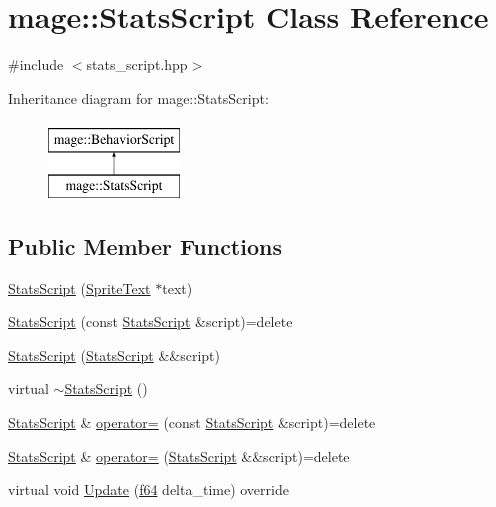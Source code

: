 \hypertarget{classmage_1_1_stats_script}{}\section{mage\+:\+:Stats\+Script Class Reference}
\label{classmage_1_1_stats_script}


{\ttfamily \#include $<$stats\+\_\+script.\+hpp$>$}

Inheritance diagram for mage\+:\+:Stats\+Script\+:\begin{figure}[H]
\begin{center}
\leavevmode
\includegraphics[height=2.000000cm]{classmage_1_1_stats_script}
\end{center}
\end{figure}
\subsection*{Public Member Functions}
\begin{DoxyCompactItemize}
\item 
\hyperlink{classmage_1_1_stats_script_a1deb5458611675fc99309edd01d285f8}{Stats\+Script} (\hyperlink{classmage_1_1_sprite_text}{Sprite\+Text} $\ast$text)
\item 
\hyperlink{classmage_1_1_stats_script_aab237b7c391d7ca7ad96cfa33a3aac81}{Stats\+Script} (const \hyperlink{classmage_1_1_stats_script}{Stats\+Script} \&script)=delete
\item 
\hyperlink{classmage_1_1_stats_script_af511d7e2e6bec30cd05782de94c65abe}{Stats\+Script} (\hyperlink{classmage_1_1_stats_script}{Stats\+Script} \&\&script)
\item 
virtual \hyperlink{classmage_1_1_stats_script_a65ba91e19c78c99831a65ad6dd6bb149}{$\sim$\+Stats\+Script} ()
\item 
\hyperlink{classmage_1_1_stats_script}{Stats\+Script} \& \hyperlink{classmage_1_1_stats_script_a7da39f1c0cc417dabdc539f49deec7c3}{operator=} (const \hyperlink{classmage_1_1_stats_script}{Stats\+Script} \&script)=delete
\item 
\hyperlink{classmage_1_1_stats_script}{Stats\+Script} \& \hyperlink{classmage_1_1_stats_script_a6adacd651debb83254e1121f32c8f21e}{operator=} (\hyperlink{classmage_1_1_stats_script}{Stats\+Script} \&\&script)=delete
\item 
virtual void \hyperlink{classmage_1_1_stats_script_a9e97150da3c2c88ae1cef9e22c191235}{Update} (\hyperlink{namespacemage_ab935747c6941320bd6214b5a5f265b09}{f64} delta\+\_\+time) override
\end{DoxyCompactItemize}
